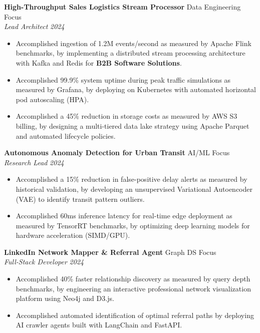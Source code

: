 \documentclass[10pt, a4paper]{article}
\newcommand{\entry}[4]{
  \noindent \textbf{#1} \hfill #2 \\
  \textit{#3} \hfill \textit{#4} \par
  \vspace{2pt}
}
\begin{document}
\entry{High-Throughput Sales Logistics Stream Processor}{Data Engineering Focus}{Lead Architect}{2024}
\begin{itemize}[leftmargin=1.5em, noitemsep]
    \item Accomplished ingestion of 1.2M events/second as measured by Apache Flink benchmarks, by implementing a distributed stream processing architecture with Kafka and Redis for \textbf{B2B Software Solutions}.
    \item Accomplished 99.9\% system uptime during peak traffic simulations as measured by Grafana, by deploying on Kubernetes with automated horizontal pod autoscaling (HPA).
    \item Accomplished a 45\% reduction in storage costs as measured by AWS S3 billing, by designing a multi-tiered data lake strategy using Apache Parquet and automated lifecycle policies.
\end{itemize}

\entry{Autonomous Anomaly Detection for Urban Transit}{AI/ML Focus}{Research Lead}{2024}
\begin{itemize}[leftmargin=1.5em, noitemsep]
    \item Accomplished a 15\% reduction in false-positive delay alerts as measured by historical validation, by developing an unsupervised Variational Autoencoder (VAE) to identify transit pattern outliers.
    \item Accomplished 60ms inference latency for real-time edge deployment as measured by TensorRT benchmarks, by optimizing deep learning models for hardware acceleration (SIMD/GPU).
\end{itemize}

\entry{LinkedIn Network Mapper \& Referral Agent}{Graph DS Focus}{Full-Stack Developer}{2024}
\begin{itemize}[leftmargin=1.5em, noitemsep]
    \item Accomplished 40\% faster relationship discovery as measured by query depth benchmarks, by engineering an interactive professional network visualization platform using Neo4j and D3.js.
    \item Accomplished automated identification of optimal referral paths by deploying AI crawler agents built with LangChain and FastAPI.
\end{itemize}

\end{document}
